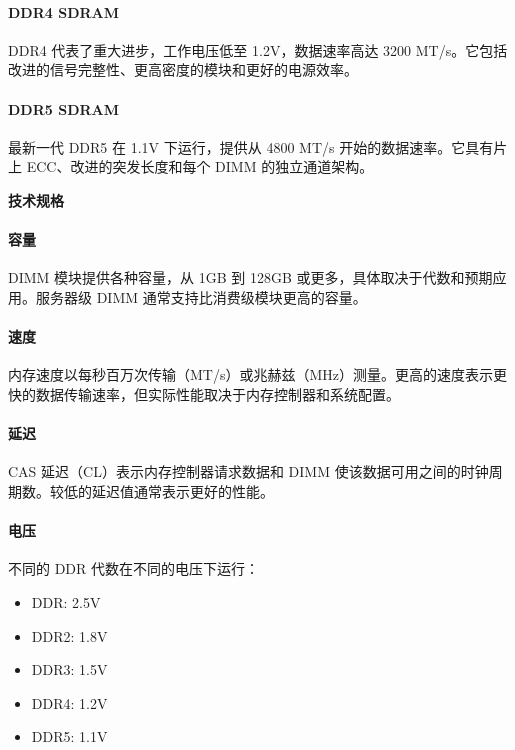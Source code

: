 \documentclass{article}
\begin{document}
\paragraph{DDR4 SDRAM}

DDR4 代表了重大进步，工作电压低至 1.2V，数据速率高达 3200 MT/s。它包括改进的信号完整性、更高密度的模块和更好的电源效率。

\paragraph{DDR5 SDRAM}

最新一代 DDR5 在 1.1V 下运行，提供从 4800 MT/s 开始的数据速率。它具有片上 ECC、改进的突发长度和每个 DIMM 的独立通道架构。

\textbf{技术规格}

\paragraph{容量}

DIMM 模块提供各种容量，从 1GB 到 128GB 或更多，具体取决于代数和预期应用。服务器级 DIMM 通常支持比消费级模块更高的容量。

\paragraph{速度}

内存速度以每秒百万次传输（MT/s）或兆赫兹（MHz）测量。更高的速度表示更快的数据传输速率，但实际性能取决于内存控制器和系统配置。

\paragraph{延迟}

CAS 延迟（CL）表示内存控制器请求数据和 DIMM 使该数据可用之间的时钟周期数。较低的延迟值通常表示更好的性能。

\paragraph{电压}

不同的 DDR 代数在不同的电压下运行：
\begin{itemize}
    \item DDR: 2.5V
    \item DDR2: 1.8V
    \item DDR3: 1.5V
    \item DDR4: 1.2V
    \item DDR5: 1.1V
\end{itemize}
\end{document}
